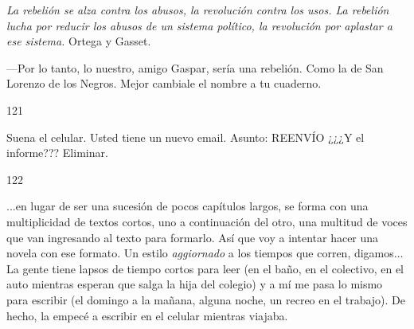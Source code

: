 \documentclass[12pt,twoside,openright,a5paper]{book}
\begin{document}
\nopagebreak

\vspace{0.5cm}

\nopagebreak

\emph{
La rebelión se alza contra los abusos, la revolución contra los
usos. La rebelión lucha por reducir los abusos de un sistema político,
la revolución por aplastar a ese sistema.} Ortega y Gasset.

---Por lo tanto, lo nuestro, amigo Gaspar, sería una rebelión. Como la de
San Lorenzo de los Negros. Mejor cambiale el nombre a tu cuaderno.


\vspace{0.5cm}

\hrulefill \hspace{0.1cm}\decofourleft\hspace{0.2cm} 121 \hspace{0.2cm}\decofourright \hspace{0.1cm}\hrulefill

\nopagebreak

\vspace{0.5cm}

\nopagebreak

Suena el celular. Usted tiene un nuevo email. Asunto: \linebreak
REENVÍO ¿¿¿Y el informe??? Eliminar.


\vspace{0.5cm}

\hrulefill \hspace{0.1cm}\decofourleft\hspace{0.2cm} 122 \hspace{0.2cm}\decofourright \hspace{0.1cm}\hrulefill

\nopagebreak

\vspace{0.5cm}

\nopagebreak

...en lugar de ser una sucesión de pocos capítulos largos, se forma con una
multiplicidad de textos cortos, uno a continuación del otro, una multitud
de voces que van ingresando al texto para formarlo. Así que voy a intentar
hacer una novela con ese formato. Un estilo \emph{aggiornado} a los tiempos que
corren, digamos... La gente tiene lapsos de tiempo cortos para leer (en el
baño, en el colectivo, en el auto mientras esperan que salga la hija del
colegio) y a mí me pasa lo mismo para escribir (el domingo a la mañana,
alguna noche, un recreo en el trabajo). De hecho, la empecé a escribir en
el celular mientras viajaba.
\end{document}
